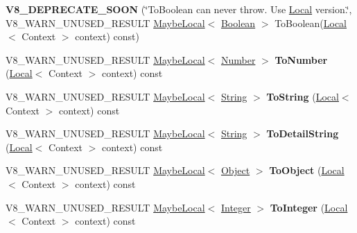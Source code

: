 \begin{DoxyCompactItemize}
\item 
\mbox{\label{classv8_1_1Value_add02ab2b2738b3d4426da92dd92274d0}} 
{\bfseries V8\+\_\+\+D\+E\+P\+R\+E\+C\+A\+T\+E\+\_\+\+S\+O\+ON} (\char`\"{}To\+Boolean can never throw. Use \mbox{\hyperlink{classv8_1_1Local}{Local}} version.\char`\"{}, V8\+\_\+\+W\+A\+R\+N\+\_\+\+U\+N\+U\+S\+E\+D\+\_\+\+R\+E\+S\+U\+LT \mbox{\hyperlink{classv8_1_1MaybeLocal}{Maybe\+Local}}$<$ \mbox{\hyperlink{classv8_1_1Boolean}{Boolean}} $>$ To\+Boolean(\mbox{\hyperlink{classv8_1_1Local}{Local}}$<$ Context $>$ context) const)
\item 
\mbox{\label{classv8_1_1Value_ab960bdf9ff28c8ebac6d79dbec61284d}} 
V8\+\_\+\+W\+A\+R\+N\+\_\+\+U\+N\+U\+S\+E\+D\+\_\+\+R\+E\+S\+U\+LT \mbox{\hyperlink{classv8_1_1MaybeLocal}{Maybe\+Local}}$<$ \mbox{\hyperlink{classv8_1_1Number}{Number}} $>$ {\bfseries To\+Number} (\mbox{\hyperlink{classv8_1_1Local}{Local}}$<$ Context $>$ context) const
\item 
\mbox{\label{classv8_1_1Value_a45d48ed5aee0b3f628193f8f2981a49b}} 
V8\+\_\+\+W\+A\+R\+N\+\_\+\+U\+N\+U\+S\+E\+D\+\_\+\+R\+E\+S\+U\+LT \mbox{\hyperlink{classv8_1_1MaybeLocal}{Maybe\+Local}}$<$ \mbox{\hyperlink{classv8_1_1String}{String}} $>$ {\bfseries To\+String} (\mbox{\hyperlink{classv8_1_1Local}{Local}}$<$ Context $>$ context) const
\item 
\mbox{\label{classv8_1_1Value_a008fbd398b776b424f0f37a93e34c19b}} 
V8\+\_\+\+W\+A\+R\+N\+\_\+\+U\+N\+U\+S\+E\+D\+\_\+\+R\+E\+S\+U\+LT \mbox{\hyperlink{classv8_1_1MaybeLocal}{Maybe\+Local}}$<$ \mbox{\hyperlink{classv8_1_1String}{String}} $>$ {\bfseries To\+Detail\+String} (\mbox{\hyperlink{classv8_1_1Local}{Local}}$<$ Context $>$ context) const
\item 
\mbox{\label{classv8_1_1Value_a50e1b7a0fb42d4df9953784d8d60c098}} 
V8\+\_\+\+W\+A\+R\+N\+\_\+\+U\+N\+U\+S\+E\+D\+\_\+\+R\+E\+S\+U\+LT \mbox{\hyperlink{classv8_1_1MaybeLocal}{Maybe\+Local}}$<$ \mbox{\hyperlink{classv8_1_1Object}{Object}} $>$ {\bfseries To\+Object} (\mbox{\hyperlink{classv8_1_1Local}{Local}}$<$ Context $>$ context) const
\item 
\mbox{\label{classv8_1_1Value_acd519ca3b1a165514bbb5cfba4d44ff7}} 
V8\+\_\+\+W\+A\+R\+N\+\_\+\+U\+N\+U\+S\+E\+D\+\_\+\+R\+E\+S\+U\+LT \mbox{\hyperlink{classv8_1_1MaybeLocal}{Maybe\+Local}}$<$ \mbox{\hyperlink{classv8_1_1Integer}{Integer}} $>$ {\bfseries To\+Integer} (\mbox{\hyperlink{classv8_1_1Local}{Local}}$<$ Context $>$ context) const

\end{DoxyCompactItemize}
